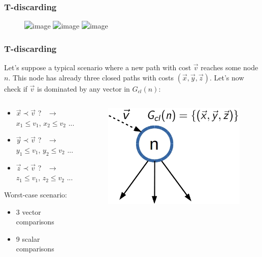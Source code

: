 \begin{frame}
\frametitle{T-discarding}
	\begin{figure}
    	\centering
		\includegraphics<1>[scale=0.4]{figs/t-discarding1}
		\includegraphics<2>[scale=0.4]{figs/t-discarding2}
		\includegraphics<3>[scale=0.4]{figs/t-discarding3}
	\end{figure}
\note{}
\end{frame}
\begin{frame}
\frametitle{T-discarding}
	Let's suppose a typical scenario where a new path with cost $\vec v$ reaches some node $n$. This node \textcolor{ao}{has already three closed paths} with costs $(\vec x, \vec y, \vec z)$. Let's now \textcolor{ao}{check if $\vec v$ is dominated} by any vector in $G_{cl}(n)$:
	\vspace{5mm}
	\begin{columns}%
	\begin{example}
	\vspace{1mm}
	\begin{itemize}
		\item $\vec x \prec \vec v$ ? \ $\rightarrow$ \ $x_1 \leq v_1$, $x_2 \leq v_2$ ...
		\item $\vec y \prec \vec v$ ? \ $\rightarrow$ \ $y_1 \leq v_1$, $y_2 \leq v_2$ ...
		\item $\vec z \prec \vec v$ ? \ $\rightarrow$ \ $z_1 \leq v_1$, $z_2 \leq v_2$ ...
	\end{itemize}
	Worst-case scenario: \\ 
	\begin{itemize}
		\item 3 vector comparisons
		\item 9 scalar comparisons
	\end{itemize}
	\end{example}
	\begin{figure}
    	\centering
		\includegraphics[scale=0.45]{figs/t-discarding}
	\end{figure}
	\end{columns}
\note{}
\end{frame}	
